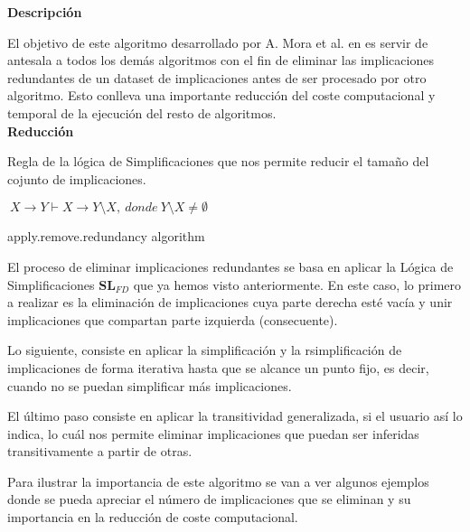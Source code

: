 \textbf{Descripci\'on} 

El objetivo de este algoritmo desarrollado por A. Mora et al. en \cite{Mora2003} es servir de antesala a todos los dem\'as algoritmos con el fin de eliminar las implicaciones redundantes de un dataset de implicaciones antes de ser procesado por otro algoritmo. Esto conlleva una importante reducci\'on del coste computacional y temporal de la ejecuci\'on del resto de algoritmos.\\

\textbf{Reducci\'on}

Regla de la l\'ogica de Simplificaciones que nos permite reducir el tama\~no del cojunto de implicaciones.

\begin{center}
    \(\ X \to Y \vdash X \to Y \setminus X, \ donde \ Y \setminus X \neq \emptyset \)
\end{center} 

\IncMargin{1em}
\begin{algorithm}[H]
    \SetAlgoLined
    \LinesNumbered
    \DontPrintSemicolon
    \caption{apply.remove.redundancy algorithm}\label{alg:1}
\end{algorithm}\DecMargin{1em}
\newpage
El proceso de eliminar implicaciones redundantes se basa en aplicar la L\'ogica de Simplificaciones \(\textbf{SL}_{FD}\) que ya hemos visto anteriormente. En este caso, lo primero a realizar es la eliminaci\'on de implicaciones cuya parte derecha est\'e vac\'ia y unir implicaciones que compartan parte izquierda (consecuente).

Lo siguiente, consiste en aplicar la simplificaci\'on y la rsimplificaci\'on de implicaciones de forma iterativa hasta que se alcance un punto fijo, es decir, cuando no se puedan simplificar m\'as implicaciones.

El \'ultimo paso consiste en aplicar la transitividad generalizada, si el usuario as\'i lo indica, lo cu\'al nos permite eliminar implicaciones que puedan ser inferidas transitivamente a partir de otras.

Para ilustrar la importancia de este algoritmo se van a ver algunos ejemplos donde se pueda apreciar el n\'umero de implicaciones que se eliminan y su importancia en la reducci\'on de coste computacional.

